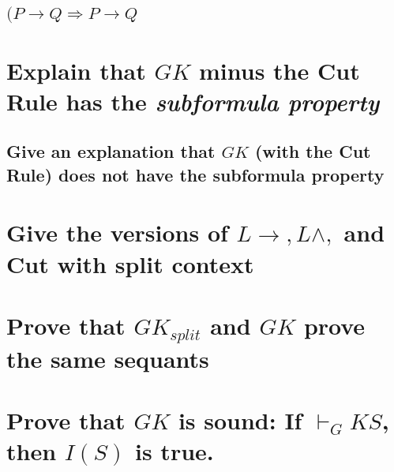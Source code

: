 \documentclass{article}
\begin{document}
\subsection{$(P \to Q \Rightarrow P \to Q$}
\section{Explain that $GK$ minus the Cut Rule has the \emph{subformula property}}
\subsection{Give an explanation that $GK$ (with the Cut Rule) does not have
the subformula property}
\section{Give the versions of $L \to, L\wedge,$ and Cut with split context}
\section{Prove that $GK_{split}$ and $GK$ prove the same sequants}
\section{Prove that $GK$ is sound: If $\vdash_GK S$, then $I(S)$ is true.}
\end{document}
